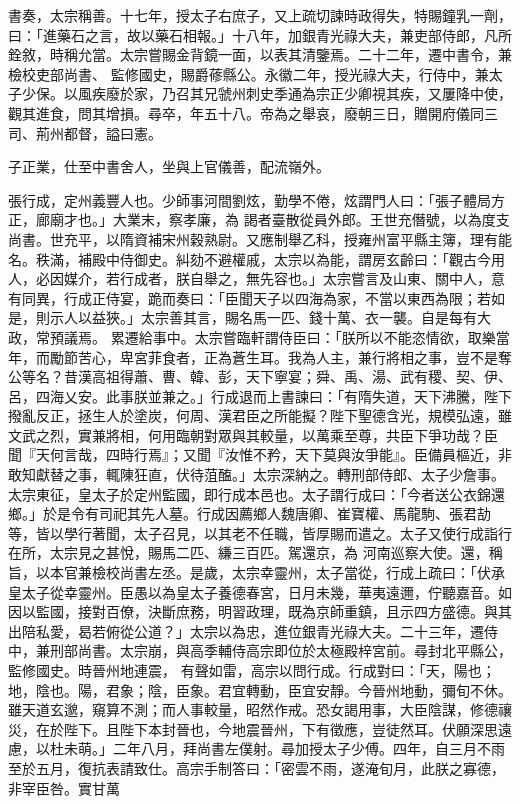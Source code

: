 \begin{pinyinscope}
 書奏，太宗稱善。十七年，授太子右庶子，又上疏切諫時政得失，特賜鐘乳一劑，曰：「進藥石之言，故以藥石相報。」十八年，加銀青光祿大夫，兼吏部侍郎，凡所銓敘，時稱允當。太宗嘗賜金背鏡一面，以表其清鑒焉。二十二年，遷中書令，兼檢校吏部尚書、
 監修國史，賜爵蓚縣公。永徽二年，授光祿大夫，行侍中，兼太子少保。以風疾廢於家，乃召其兄虢州刺史季通為宗正少卿視其疾，又屢降中使，觀其進食，問其增損。尋卒，年五十八。帝為之舉哀，廢朝三日，贈開府儀同三司、荊州都督，謚曰憲。



 子正業，仕至中書舍人，坐與上官儀善，配流嶺外。



 張行成，定州義豐人也。少師事河間劉炫，勤學不倦，炫謂門人曰：「張子體局方正，廊廟才也。」大業末，察孝廉，為
 謁者臺散從員外郎。王世充僭號，以為度支尚書。世充平，以隋資補宋州穀熟尉。又應制舉乙科，授雍州富平縣主簿，理有能名。秩滿，補殿中侍御史。糾劾不避權戚，太宗以為能，謂房玄齡曰：「觀古今用人，必因媒介，若行成者，朕自舉之，無先容也。」太宗嘗言及山東、關中人，意有同異，行成正侍宴，跪而奏曰：「臣聞天子以四海為家，不當以東西為限；若如是，則示人以益狹。」太宗善其言，賜名馬一匹、錢十萬、衣一襲。自是每有大政，常預議焉。
 累遷給事中。太宗嘗臨軒謂侍臣曰：「朕所以不能恣情欲，取樂當年，而勵節苦心，卑宮菲食者，正為蒼生耳。我為人主，兼行將相之事，豈不是奪公等名？昔漢高祖得蕭、曹、韓、彭，天下寧宴；舜、禹、湯、武有稷、契、伊、呂，四海乂安。此事朕並兼之。」行成退而上書諫曰：「有隋失道，天下沸騰，陛下撥亂反正，拯生人於塗炭，何周、漢君臣之所能擬？陛下聖德含光，規模弘遠，雖文武之烈，實兼將相，何用臨朝對眾與其較量，以萬乘至尊，共臣下爭功哉？臣
 聞『天何言哉，四時行焉』；又聞『汝惟不矜，天下莫與汝爭能』。臣備員樞近，非敢知獻替之事，輒陳狂直，伏待菹醢。」太宗深納之。轉刑部侍郎、太子少詹事。太宗東征，皇太子於定州監國，即行成本邑也。太子謂行成曰：「今者送公衣錦還鄉。」於是令有司祀其先人墓。行成因薦鄉人魏唐卿、崔寶權、馬龍駒、張君劼等，皆以學行著聞，太子召見，以其老不任職，皆厚賜而遣之。太子又使行成詣行在所，太宗見之甚悅，賜馬二匹、縑三百匹。駕還京，為
 河南巡察大使。還，稱旨，以本官兼檢校尚書左丞。是歲，太宗幸靈州，太子當從，行成上疏曰：「伏承皇太子從幸靈州。臣愚以為皇太子養德春宮，日月未幾，華夷遠邇，佇聽嘉音。如因以監國，接對百僚，決斷庶務，明習政理，既為京師重鎮，且示四方盛德。與其出陪私愛，曷若俯從公道？」太宗以為忠，進位銀青光祿大夫。二十三年，遷侍中，兼刑部尚書。太宗崩，與高季輔侍高宗即位於太極殿梓宮前。尋封北平縣公，監修國史。時晉州地連震，
 有聲如雷，高宗以問行成。行成對曰：「天，陽也；地，陰也。陽，君象；陰，臣象。君宜轉動，臣宜安靜。今晉州地動，彌旬不休。雖天道玄邈，窺算不測；而人事較量，昭然作戒。恐女謁用事，大臣陰謀，修德禳災，在於陛下。且陛下本封晉也，今地震晉州，下有徵應，豈徒然耳。伏願深思遠慮，以杜未萌。」二年八月，拜尚書左僕射。尋加授太子少傅。四年，自三月不雨至於五月，復抗表請致仕。高宗手制答曰：「密雲不雨，遂淹旬月，此朕之寡德，非宰臣咎。實甘萬

\end{pinyinscope}
